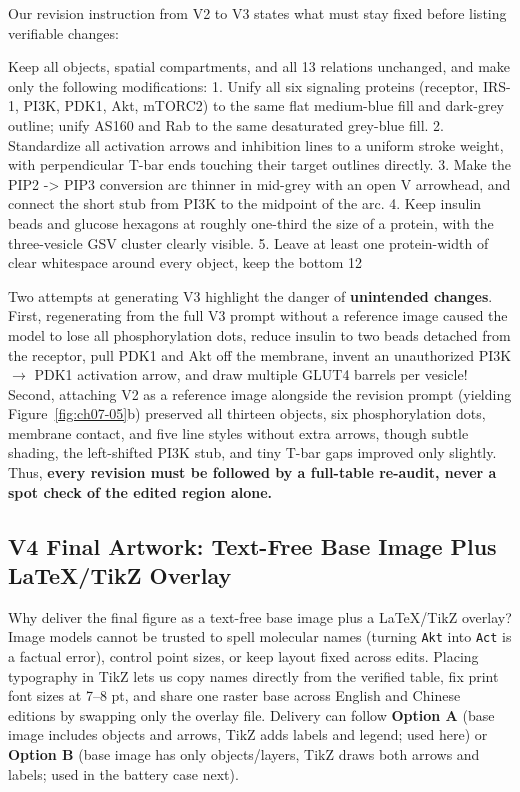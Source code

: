 Our revision instruction from V2 to V3 states what must stay fixed before listing verifiable changes:

\begin{Prompt}
Keep all objects, spatial compartments, and all 13 relations unchanged, and make only
the following modifications:
1. Unify all six signaling proteins (receptor, IRS-1, PI3K, PDK1, Akt, mTORC2) to the
   same flat medium-blue fill and dark-grey outline; unify AS160 and Rab to the same
   desaturated grey-blue fill.
2. Standardize all activation arrows and inhibition lines to a uniform stroke weight,
   with perpendicular T-bar ends touching their target outlines directly.
3. Make the PIP2 -> PIP3 conversion arc thinner in mid-grey with an open V arrowhead,
   and connect the short stub from PI3K to the midpoint of the arc.
4. Keep insulin beads and glucose hexagons at roughly one-third the size of a protein,
   with the three-vesicle GSV cluster clearly visible.
5. Leave at least one protein-width of clear whitespace around every object, keep the
   bottom 12%
\end{Prompt}

Two attempts at generating V3 highlight the danger of \textbf{unintended changes}. First, regenerating from the full V3 prompt without a reference image caused the model to lose all phosphorylation dots, reduce insulin to two beads detached from the receptor, pull PDK1 and Akt off the membrane, invent an unauthorized PI3K $\rightarrow$ PDK1 activation arrow, and draw multiple GLUT4 barrels per vesicle! Second, attaching V2 as a reference image alongside the revision prompt (yielding Figure~\ref{fig:ch07-05}b) preserved all thirteen objects, six phosphorylation dots, membrane contact, and five line styles without extra arrows, though subtle shading, the left-shifted PI3K stub, and tiny T-bar gaps improved only slightly. Thus, \textbf{every revision must be followed by a full-table re-audit, never a spot check of the edited region alone.}

\subsection{V4 Final Artwork: Text-Free Base Image Plus LaTeX/TikZ Overlay}

Why deliver the final figure as a text-free base image plus a LaTeX/TikZ overlay? Image models cannot be trusted to spell molecular names (turning \texttt{Akt} into \texttt{Act} is a factual error), control point sizes, or keep layout fixed across edits. Placing typography in TikZ lets us copy names directly from the verified table, fix print font sizes at 7--8 pt, and share one raster base across English and Chinese editions by swapping only the overlay file. Delivery can follow \textbf{Option A} (base image includes objects and arrows, TikZ adds labels and legend; used here) or \textbf{Option B} (base image has only objects/layers, TikZ draws both arrows and labels; used in the battery case next).

